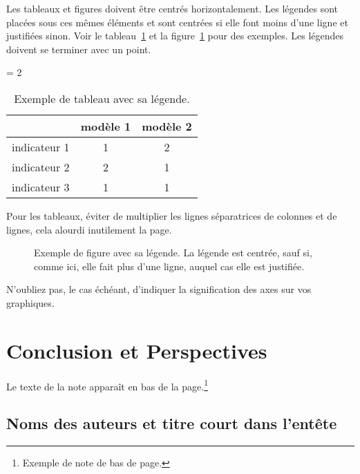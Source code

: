 \documentclass[a4paper,pagenum,french,showlayout]{rnti}
\begin{document}
Les tableaux et figures doivent être centrés horizontalement. Les
légendes sont placées sous ces mêmes éléments et sont centrées si
elle font moins d'une ligne et justifiées sinon. Voir le
tableau~\ref{tab_exemple} et la figure~\ref{fig_exemple} pour des
exemples. Les légendes doivent se terminer avec un point.



\begin{table}[ht]
 \begin{center}
   \tabcolsep = 2\tabcolsep
   \begin{tabular}{lcc}
   \hline\hline
                & modèle 1 & modèle 2 \\
   \hline
   indicateur 1 & 1        & 2        \\
   indicateur 2 & 2        & 1        \\
   indicateur 3 & 1        & 1        \\
   \hline
   \end{tabular}
\caption{Exemple de tableau avec sa légende.} \label{tab_exemple}
 \end{center}
\end{table}

Pour les tableaux, éviter de multiplier les lignes séparatrices de
colonnes et de lignes, cela alourdi inutilement la page.


\begin{figure}[t]
\begin{center}
 \caption{Exemple de figure avec sa légende. La légende est centrée,
sauf si, comme ici, elle fait plus d'une ligne, auquel cas elle est
justifiée.} \label{fig_exemple}
\end{center}
\end{figure}

N'oubliez pas, le cas échéant, d'indiquer la signification des axes
sur vos graphiques.


\section{Conclusion et Perspectives}

Le texte de la note apparaît en bas de la page.\footnote{Exemple de
note de bas de page.}

\subsection{Noms des auteurs et titre court dans l'entête}
\end{document}
